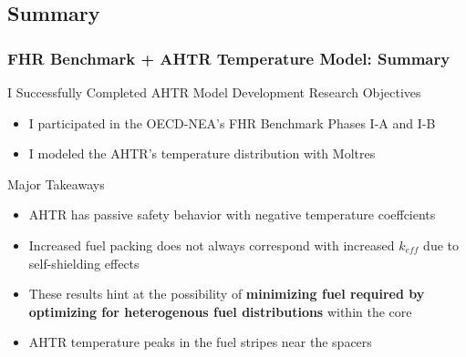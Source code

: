 \subsection{Summary}
\begin{frame}
    \frametitle{FHR Benchmark + AHTR Temperature Model: Summary}
    \begin{block}{I Successfully Completed AHTR Model Development Research Objectives}
        \begin{itemize}
            \item I participated in the OECD-NEA's FHR Benchmark Phases I-A and I-B
            \item I modeled the \gls{AHTR}'s temperature distribution with Moltres
        \end{itemize}
    \end{block}
    \begin{block}{Major Takeaways}
        \begin{itemize}
            \item AHTR has passive safety behavior with negative temperature coeffcients
            \item Increased fuel packing does not always correspond with increased 
            $k_{eff}$ due to self-shielding effects 
            \item These results hint at the possibility of \textbf{minimizing fuel required by 
            optimizing for heterogenous fuel distributions} within the core
            \item AHTR temperature peaks in the fuel stripes near the spacers 
        \end{itemize}
    \end{block}
\end{frame}

